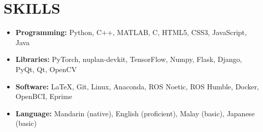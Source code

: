 \documentclass[a4paper,9pt]{extarticle}
\begin{document}
\section*{SKILLS}
\begin{itemize}
    \item \textbf{Programming:} Python, C++, MATLAB, C, HTML5, CSS3, JavaScript, Java
    \item \textbf{Libraries:} PyTorch, nuplan-devkit, TensorFlow, Numpy, Flask, Django, PyQt, Qt, OpenCV
    \item \textbf{Software:} \LaTeX, Git, Linux, Anaconda, ROS Noetic, ROS Humble, Docker, OpenBCI, Eprime
    \item \textbf{Language:} Mandarin (native), English (proficient), Malay (basic), Japanese (basic)
\end{itemize}
\end{document}
